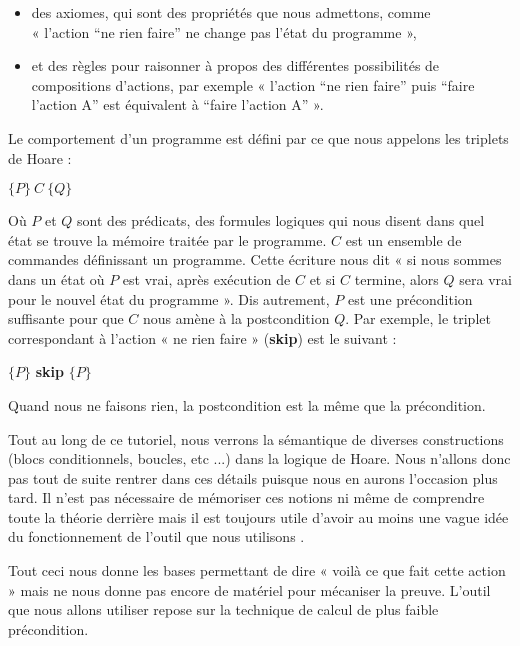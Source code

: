\begin{itemize}
\item des axiomes, qui sont des propriétés que nous admettons, comme \\
« l'action “ne rien faire” ne change pas l'état du programme »,
\item et des règles pour raisonner à propos des différentes possibilités de 
compositions d'actions, par exemple « l'action “ne rien faire” puis “faire 
l'action A” est équivalent à “faire l'action A” ».
\end{itemize}


Le comportement d'un programme est défini par ce que nous appelons les triplets
de Hoare :




\begin{center}
$\{P\}\ C\ \{Q\}$
\end{center}


Où $P$ et $Q$ sont des prédicats, des formules logiques qui nous disent dans 
quel état se trouve la mémoire traitée par le programme. $C$ est un ensemble de
commandes définissant un programme. Cette écriture nous dit « si nous sommes 
dans un état où $P$ est vrai, après exécution de $C$ et si $C$ termine, 
alors $Q$ sera vrai pour le nouvel état du programme ». Dis autrement, $P$ est 
une précondition suffisante pour que $C$ nous amène à la postcondition $Q$. 
Par exemple, le triplet correspondant à l'action « ne rien faire » (\textbf{skip}) 
est le suivant :




\begin{center}
$\{P\}$ \textbf{skip} $\{P\}$
\end{center}


Quand nous ne faisons rien, la postcondition est la même que la précondition.



Tout au long de ce tutoriel, nous verrons la sémantique de diverses 
constructions (blocs conditionnels, boucles, etc ...) dans la logique de Hoare.
Nous n'allons donc pas tout de suite rentrer dans ces détails puisque nous en
aurons l'occasion plus tard. Il n'est pas nécessaire de mémoriser ces notions
ni même de comprendre toute la théorie derrière mais il est toujours utile
d'avoir au moins une vague idée du fonctionnement de l'outil que nous
utilisons  .



Tout ceci nous donne les bases permettant de dire « voilà ce que fait cette 
action » mais ne nous donne pas encore de matériel pour mécaniser la preuve. 
L'outil que nous allons utiliser repose sur la technique de calcul de plus 
faible précondition.



